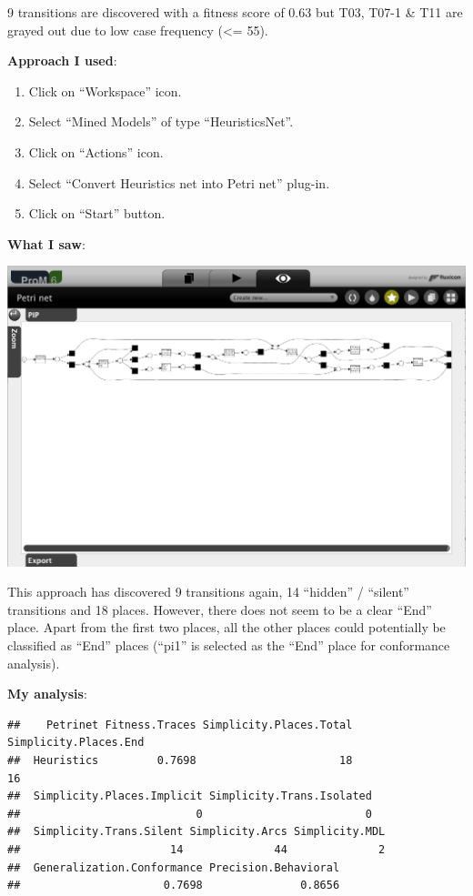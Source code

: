 \documentclass[]{article}
\begin{document}
9 transitions are discovered with a fitness score of 0.63 but T03, T07-1
\& T11 are grayed out due to low case frequency (\textless{}= 55).

\textbf{Approach I used}:

\begin{enumerate}
\def\labelenumi{\arabic{enumi}.}
\setcounter{enumi}{19}
\itemsep1pt\parskip0pt
\item
  Click on ``Workspace'' icon.
\item
  Select ``Mined Models'' of type ``HeuristicsNet''.
\item
  Click on ``Actions'' icon.
\item
  Select ``Convert Heuristics net into Petri net'' plug-in.
\item
  Click on ``Start'' button.
\end{enumerate}

\textbf{What I saw}:

\includegraphics{CoSeLoG_Step_05_Filter96_PetriNet_Heuristics.png}

This approach has discovered 9 transitions again, 14 ``hidden'' /
``silent'' transitions and 18 places. However, there does not seem to be
a clear ``End'' place. Apart from the first two places, all the other
places could potentially be classified as ``End'' places (``pi1'' is
selected as the ``End'' place for conformance analysis).

\textbf{My analysis}:

\begin{verbatim}
##    Petrinet Fitness.Traces Simplicity.Places.Total Simplicity.Places.End
##  Heuristics         0.7698                      18                    16
##  Simplicity.Places.Implicit Simplicity.Trans.Isolated
##                           0                         0
##  Simplicity.Trans.Silent Simplicity.Arcs Simplicity.MDL
##                       14              44              2
##  Generalization.Conformance Precision.Behavioral
##                      0.7698               0.8656
\end{verbatim}
\end{document}
